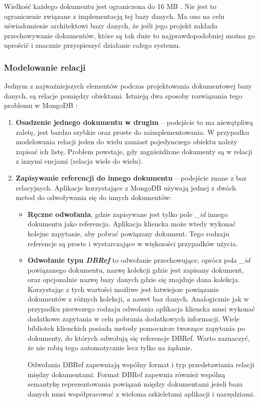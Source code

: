 Wielkość każdego dokumentu jest ograniczona do 16 MB \cite{DocumentsManual}.
Nie jest to ograniczenie związane z implementacją tej bazy danych.
Ma ono na celu uświadomienie architektowi bazy danych, że jeśli jego projekt zakłada przechowywanie dokumentów, które są tak duże to najprawdopodobniej można go uprościć i znacznie przyspieszyć działanie całego systemu.

\subsubsection{Modelowanie relacji}

Jednym z najważniejszych elementów podczas projektowania dokumentowej bazy danych, są relacje pomiędzy obiektami.
Istnieją dwa sposoby rozwiązania tego problemu w MongoDB \cite{MongoDBRefs}:
\begin{enumerate}
    \item \textbf{Osadzenie jednego dokumentu w drugim} -- podejście to ma niewątpliwą zaletę, jest bardzo szybkie oraz proste do zaimplementowania.
    W przypadku modelowania relacji jeden do wielu zamiast pojedynczego obiektu należy zapisać ich listę.
    Problem powstaje, gdy zagnieżdżone dokumenty są w relacji z innymi encjami (relacja wiele do wielu).
    \item \textbf{Zapisywanie referencji do innego dokumentu} -- podejście znane z baz relacyjnych.
    Aplikacje korzystające z MongoDB używają jednej z dwóch metod do odwoływania się do innych dokumentów:
    \begin{itemize}
        \item \textbf{Ręczne odwołania}, gdzie zapisywane jest tylko pole \textit{\_id} innego dokumentu jako referencja.
        Aplikacja kliencka może wtedy wykonać kolejne zapytanie, aby pobrać powiązany dokument.
        Tego rodzaju referencje są proste i wystarczające w większości przypadków użycia.
        \item \textbf{Odwołanie typu \textit{DBRef}} to odwołanie przechowujące, oprócz pola \textit{\_id} powiązanego dokumentu, nazwę kolekcji gdzie jest zapisany dokument, oraz opcjonalnie nazwę bazy danych gdzie się znajduje dana kolekcja.
        Korzystając z tych wartości możliwe jest łatwiejsze powiązanie dokumentów z różnych kolekcji, a nawet baz danych.
        Analogicznie jak w przypadku pierwszego rodzaju odwołania aplikacja kliencka musi wykonać dodatkowe zapytania w celu pobrania dodatkowych informacji.
        Wiele bibliotek klienckich posiada metody pomocnicze tworzące zapytania po dokumenty, do których odwołują się referencje DBRef.
        Warto zaznaczyć, że nie robią tego automatycznie lecz tylko na żądanie.
        
        Odwołania DBRef zapewniają wspólny format i typ przedstawiania relacji między dokumentami.
        Format DBRef zapewnia również wspólną semantykę reprezentowania powiązań między dokumentami jeżeli baza danych musi współpracować z wieloma szkieletami aplikacji i narzędziami.
    \end{itemize}
\end{enumerate}

